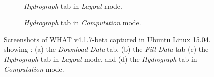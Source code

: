 \documentclass[WHATMANUAL.tex]{subfiles}
\begin{document}
\begin{figure}[!h]
\begin{subfigure}[t]{0.45\textwidth}
        \label{subfig:ScnShot_001}
    \end{subfigure}
    \\[0.5cm]
    \begin{subfigure}[t]{0.45\textwidth}
        \setlength{\fboxsep}{0pt}
        \caption{\emph{Hydrograph} tab in \emph{Layout} mode.}
        \label{subfig:ScnShot_002}
    \end{subfigure}
    \hspace{0.5cm}
    \begin{subfigure}[t]{0.45\textwidth}
        \setlength{\fboxsep}{0pt}
        \caption{\emph{Hydrograph} tab in \emph{Computation} mode.}
        \label{subfig:ScnShot_003}
    \end{subfigure}
    \caption[Screenshots of WHAT v4.1.7-beta captured in Ubuntu Linux 15.04.]{Screenshots of WHAT v4.1.7-beta captured in Ubuntu Linux 15.04. showing : (a) the \emph{Download Data} tab, (b) the \emph{Fill Data} tab (c) the \emph{Hydrograph} tab in \emph{Layout} mode, and (d) the \emph{Hydrograph} tab in \emph{Computation} mode.}\label{fig:WHAT_GUI_ScnShot}
\end{figure}
\end{document}
